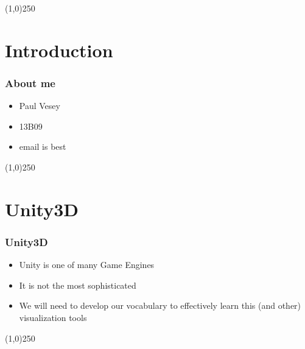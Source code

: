 %


\lstset{language=HTML,
				basicstyle=\small,
				breaklines=true,
        numbers=left,
        numberstyle=\tiny,
        showstringspaces=false,
        aboveskip=-20pt,
        frame=leftline
        }



\tableofcontents
\newpage



\begin{frame}
\titlepage
\end{frame}\begin{center}\line(1,0){250}\end{center}
%
%


\section{Introduction}




\begin{frame}
\frametitle{About me}
\begin{itemize}
	\item Paul Vesey
	\item 13B09
	\item email is best
\end{itemize}

\end{frame}
\begin{center}\line(1,0){250}\end{center}







\section{Unity3D}



\begin{frame}
\frametitle{Unity3D}
\begin{itemize}
	\item Unity is one of many Game Engines
	\item It is not the most sophisticated
	\item We will need to develop our vocabulary to effectively learn this (and other) visualization tools
\end{itemize}
\end{frame}
\begin{center}\line(1,0){250}\end{center}



